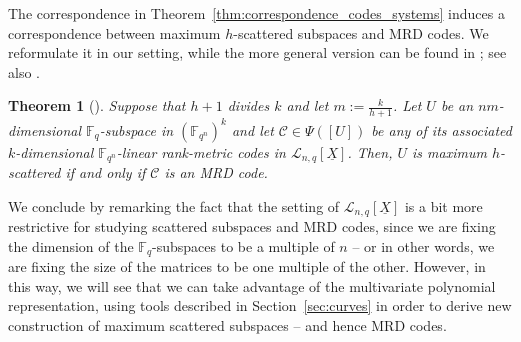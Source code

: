 \documentclass[11pt]{article}
\newtheorem{theorem}[theo]{Theorem}
\theoremstyle{definition}
\numberwithin{equation}{section}
\begin{document}
The correspondence in Theorem~\ref{thm:correspondence_codes_systems} induces a correspondence between maximum $h$-scattered subspaces and MRD codes. We reformulate it in our setting, while the more general version can be found in \cite[Theorem 3.2]{zini2021scattered}; see also \cite[Theorem 4.9]{marino2022evasive}.

\begin{theorem}[\textnormal{\cite[Theorem 3.2]{zini2021scattered}}]\label{thm:hscattered_MRD}
 Suppose that $h+1$ divides $k$ and let $m:=\frac{k}{h+1}$. Let $U$ be an $nm$-dimensional $\mathbb{F}_q$-subspace in $(\mathbb{F}_{q^n})^k$ and let $\mathcal{C}\in \Psi([U])$ be any of its associated $k$-dimensional ${\mathbb F}_{q^n}$-linear rank-metric codes in $\mathcal{L}_{n,q}[\underline{X}]$. Then, $U$ is maximum $h$-scattered if and only if $\mathcal{C}$ is an MRD code.
\end{theorem}

We conclude by remarking the fact that the setting of $\mathcal{L}_{n,q}[\underline{X}]$ is a bit more restrictive for studying scattered subspaces and MRD codes, since we are fixing the dimension of the $\mathbb{F}_q$-subspaces to be a multiple of $n$ -- or in other words, we are fixing the size of the matrices to be one multiple of the other. 
However, in this way, we will see that we can  take advantage of the multivariate polynomial representation, using tools described in  Section~\ref{sec:curves} in order to derive new construction of maximum scattered subspaces -- and hence MRD codes.
\end{document}
